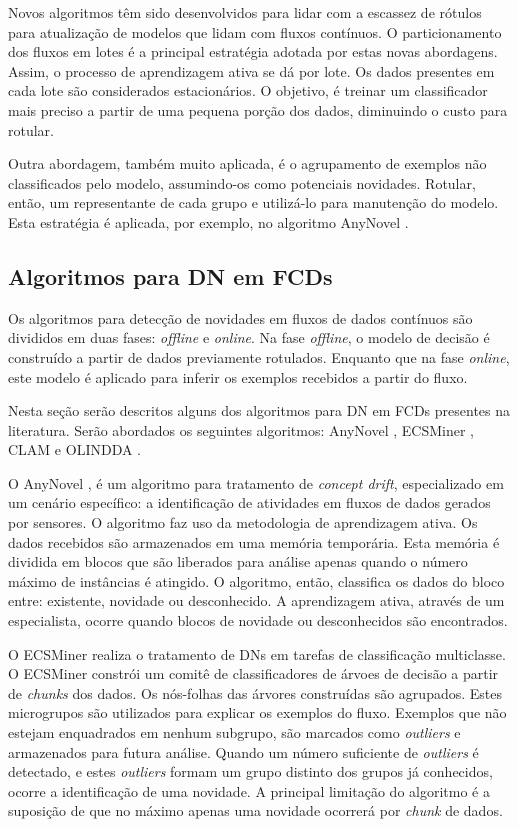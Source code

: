 \documentclass[qual, classic, a4paper]{ufbathesis}
\begin{document}
Novos algoritmos têm sido desenvolvidos para lidar com a escassez de rótulos para atualização de modelos que lidam com fluxos contínuos. 
O particionamento dos fluxos em lotes é a principal estratégia adotada por estas novas abordagens. Assim, o processo de aprendizagem ativa se dá por lote. Os dados presentes em cada lote são considerados estacionários. O objetivo, é treinar um classificador mais preciso a partir de uma pequena porção dos dados, diminuindo o custo para rotular.

Outra abordagem, também muito aplicada, é o agrupamento de exemplos não classificados pelo modelo, assumindo-os como potenciais novidades. Rotular, então, um representante de cada grupo e utilizá-lo para manutenção do modelo. Esta estratégia é aplicada, por exemplo, no algoritmo AnyNovel \cite{Abdallah}.

\subsection{Algoritmos para DN em FCDs}

Os algoritmos para detecção de novidades em fluxos de dados contínuos são divididos em duas fases: \textit{offline} e \textit{online}. Na fase \textit{offline}, o modelo de decisão é construído a partir de dados previamente rotulados. Enquanto que na fase \textit{online}, este modelo é aplicado para inferir os exemplos recebidos a partir do fluxo. 

Nesta seção serão descritos alguns dos algoritmos para DN em FCDs presentes na literatura. Serão abordados os seguintes algoritmos: AnyNovel \cite{Abdallah}, ECSMiner \cite{Masud:2010:ACC:1933307.1934606}, CLAM \cite{malkhateeb} e OLINDDA \cite{Spinosa:2009:NDA:1551768.1551770}.

O AnyNovel \cite{Abdallah}, é um algoritmo para tratamento de \textit{concept drift}, especializado em um cenário específico: a identificação de atividades em fluxos de dados gerados por sensores. O algoritmo faz uso da metodologia de aprendizagem ativa. Os dados recebidos são armazenados em uma memória temporária. Esta memória é dividida em blocos que são liberados para análise apenas quando o número máximo de instâncias é atingido. O algoritmo, então, classifica os dados do bloco entre: existente, novidade ou desconhecido. A aprendizagem ativa, através de um especialista, ocorre quando blocos de novidade ou desconhecidos são encontrados.

O ECSMiner \cite{Masud:2010:ACC:1933307.1934606} realiza o tratamento de DNs em tarefas de classificação multiclasse. O ECSMiner constrói um comitê de classificadores de árvoes de decisão a partir de \textit{chunks} dos dados. Os nós-folhas das árvores construídas são agrupados.
Estes microgrupos são utilizados para explicar os exemplos do fluxo. Exemplos que não estejam enquadrados em nenhum subgrupo, são marcados como \textit{outliers} e armazenados para futura análise. 
Quando um número suficiente de \textit{outliers} é detectado, e estes \textit{outliers} formam um grupo distinto dos grupos já conhecidos, ocorre a identificação de uma novidade. A principal limitação do algoritmo é a suposição de que no máximo apenas uma novidade ocorrerá por \textit{chunk} de dados.
\end{document}
